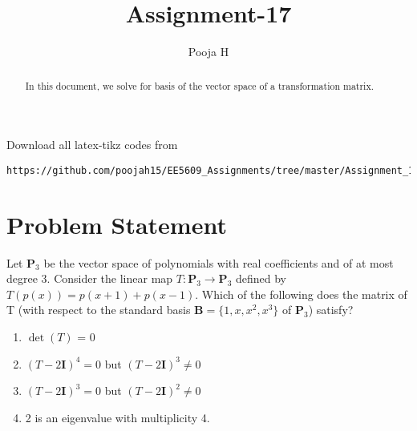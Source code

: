 \documentclass[journal,12pt,twocolumn]{IEEEtran}
\begin{document}
	\makeatother
	\let\StandardTheFigure\thefigure
	\let\vec\mathbf
	\renewcommand{\thefigure}{\theproblem}
	\def\putbox#1#2#3{\makebox[0in][l]{\makebox[#1][l]{}\raisebox{\baselineskip}[0in][0in]{\raisebox{#2}[0in][0in]{#3}}}}
	\def\rightbox#1{\makebox[0in][r]{#1}}
	\def\centbox#1{\makebox[0in]{#1}}
	\def\topbox#1{\raisebox{-\baselineskip}[0in][0in]{#1}}
	\def\midbox#1{\raisebox{-0.5\baselineskip}[0in][0in]{#1}}
	\vspace{3cm}
	\title{Assignment-17}
	\author{Pooja H}
	\maketitle
	\newpage
	\bigskip
	\renewcommand{\thefigure}{\theenumi}
	\renewcommand{\thetable}{\theenumi}
	\begin{abstract}
		In this document, we solve for basis of the vector space of a transformation matrix.
	\end{abstract}
	Download all latex-tikz codes from 
\begin{lstlisting}
https://github.com/poojah15/EE5609_Assignments/tree/master/Assignment_17
\end{lstlisting}
	\section{Problem Statement}
	
	
	
Let ${\vec{P}_{3}}$ be the vector space of polynomials with real coefficients and of at most degree 3. Consider the linear map $T:\vec{P}_3 \rightarrow \vec{P}_3$ defined by $T(p(x)) = p(x+1)+p(x-1)$. Which of the following does the matrix of T (with respect to the standard basis $\vec{B} =\{1, x, x^2, x^3\}$ of $\vec{P}_3$) satisfy?
\begin{enumerate}
\item  $\det(T)$ = 0 
\item $(T-2\vec{I})^4=0$ but $(T-2\vec{I})^3 \ne 0$
\item $(T-2\vec{I})^3=0$ but $(T-2\vec{I})^2 \ne 0$
\item 2 is an eigenvalue with multiplicity 4.
\end{enumerate}
\end{document}
